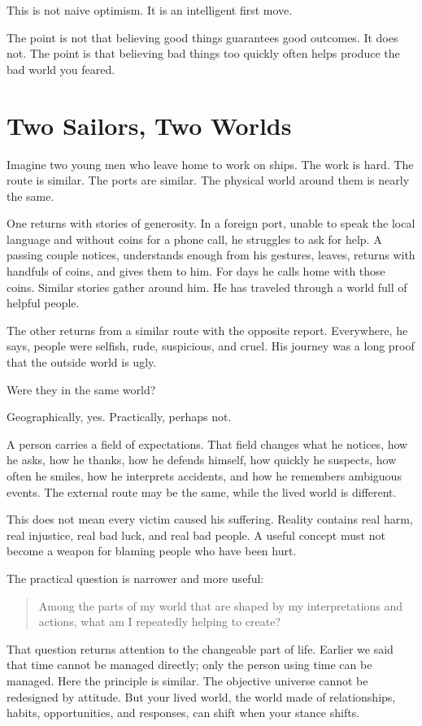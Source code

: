 This is not naive optimism. It is an intelligent first move.

The point is not that believing good things guarantees good outcomes. It does not. The point is that believing bad things too quickly often helps produce the bad world you feared.

\section*{Two Sailors, Two Worlds}

Imagine two young men who leave home to work on ships. The work is hard. The route is similar. The ports are similar. The physical world around them is nearly the same.

One returns with stories of generosity. In a foreign port, unable to speak the local language and without coins for a phone call, he struggles to ask for help. A passing couple notices, understands enough from his gestures, leaves, returns with handfuls of coins, and gives them to him. For days he calls home with those coins. Similar stories gather around him. He has traveled through a world full of helpful people.

The other returns from a similar route with the opposite report. Everywhere, he says, people were selfish, rude, suspicious, and cruel. His journey was a long proof that the outside world is ugly.

Were they in the same world?

Geographically, yes. Practically, perhaps not.

A person carries a field of expectations. That field changes what he notices, how he asks, how he thanks, how he defends himself, how quickly he suspects, how often he smiles, how he interprets accidents, and how he remembers ambiguous events. The external route may be the same, while the lived world is different.

This does not mean every victim caused his suffering. Reality contains real harm, real injustice, real bad luck, and real bad people. A useful concept must not become a weapon for blaming people who have been hurt.

The practical question is narrower and more useful:

\begin{quote}
Among the parts of my world that are shaped by my interpretations and actions, what am I repeatedly helping to create?
\end{quote}

That question returns attention to the changeable part of life. Earlier we said that time cannot be managed directly; only the person using time can be managed. Here the principle is similar. The objective universe cannot be redesigned by attitude. But your lived world, the world made of relationships, habits, opportunities, and responses, can shift when your stance shifts.

